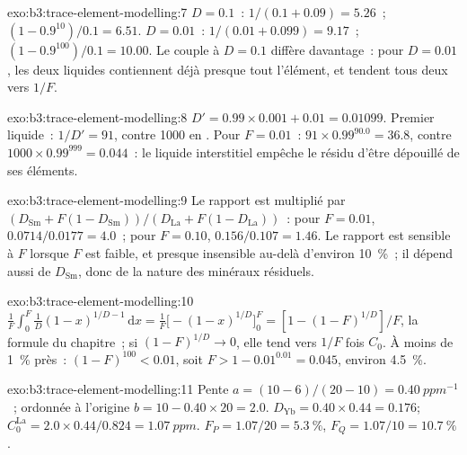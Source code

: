 \begin{solution}{exo:b3:trace-element-modelling:7}
$D = 0.1$~:  $1/(0.1 + 0.09) = 5.26$~;  $(1 - 0.9^{10})/0.1 =
6.51$. $D = 0.01$~:  $1/(0.01 + 0.099) = 9.17$~; 
$(1 - 0.9^{100})/0.1 = 10.00$. Le couple à $D = 0.1$ diffère davantage~: pour
$D = 0.01$, les deux liquides contiennent déjà presque tout l'élément, et tendent tous deux vers
$1/F$.
\end{solution}

\begin{solution}{exo:b3:trace-element-modelling:8}
$D' = 0.99\times0.001 + 0.01 = 0.01099$. Premier liquide~: $1/D' = 91$, contre
1000 en . Pour $F = 0.01$~: $91\times0.99^{90.0} = 36.8$,
contre $1000\times0.99^{999} = 0.044$~: le liquide interstitiel empêche le résidu
d'être dépouillé de ses éléments.
\end{solution}

\begin{solution}{exo:b3:trace-element-modelling:9}
Le rapport est multiplié par $(D_{\mathrm{Sm}} + F(1 - D_{\mathrm{Sm}}))/(D_{\mathrm{La}}
+ F(1 - D_{\mathrm{La}}))$~: pour $F = 0.01$, $0.0714/0.0177 = 4.0$~; pour $F = 0.10$,
$0.156/0.107 = 1.46$. Le rapport est sensible à $F$ lorsque $F$ est faible, et presque
insensible au-delà d'environ \qty{10}{\percent}~; il dépend aussi de $D_{\mathrm{Sm}}$,
donc de la nature des minéraux résiduels.
\end{solution}

\begin{solution}{exo:b3:trace-element-modelling:10}
$\frac1F\int_0^F \frac1D(1 - x)^{1/D - 1}\,\mathrm dx = \frac1F\bigl[-(1 -
x)^{1/D}\bigr]_0^F = [1 - (1 - F)^{1/D}]/F$, la formule du chapitre~; si
$(1 - F)^{1/D} \to 0$, elle tend vers $1/F$ fois $C_0$. À moins de \qty{1}{\percent} près~:
$(1 - F)^{100} < 0.01$, soit $F > 1 - 0.01^{0.01} = 0.045$, environ
\qty{4.5}{\percent}.
\end{solution}

\begin{solution}{exo:b3:trace-element-modelling:11}
Pente $a = (10 - 6)/(20 - 10) = \qty{0.40}{ppm^{-1}}$~; ordonnée à l'origine $b = 10 -
0.40\times20 = 2.0$. $D_{\mathrm{Yb}} = 0.40\times0.44 = 0.176$;
$C_0^{\mathrm{La}} = 2.0\times0.44/0.824 = \qty{1.07}{ppm}$. $F_P = 1.07/20 =
\qty{5.3}{\percent}$, $F_Q = 1.07/10 = \qty{10.7}{\percent}$.
\end{solution}

